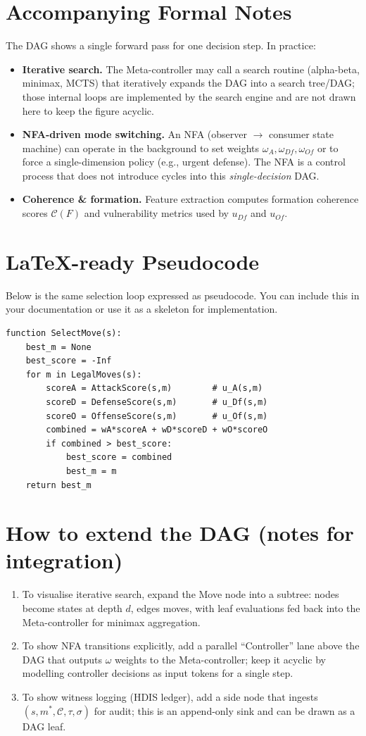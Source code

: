 \documentclass[12pt,a4paper]{article}
\begin{document}
\section{Accompanying Formal Notes}
The DAG shows a single forward pass for one decision step. In practice:
\begin{itemize}
  \item \textbf{Iterative search.} The Meta-controller may call a search routine (alpha-beta, minimax, MCTS) that iteratively expands the DAG into a search tree/DAG; those internal loops are implemented by the search engine and are not drawn here to keep the figure acyclic.
  \item \textbf{NFA-driven mode switching.} An NFA (observer \(\to\) consumer state machine) can operate in the background to set weights $\omega_A,\omega_{Df},\omega_{Of}$ or to force a single-dimension policy (e.g., urgent defense). The NFA is a control process that does not introduce cycles into this \emph{single-decision} DAG.
  \item \textbf{Coherence \& formation.} Feature extraction computes formation coherence scores $\mathcal C(F)$ and vulnerability metrics used by $u_{Df}$ and $u_{Of}$.
\end{itemize}

\section{LaTeX-ready Pseudocode}
Below is the same selection loop expressed as pseudocode. You can include this in your documentation or use it as a skeleton for implementation.

\begin{lstlisting}[caption={Decision selection pseudocode}]
function SelectMove(s):
    best_m = None
    best_score = -Inf
    for m in LegalMoves(s):
        scoreA = AttackScore(s,m)        # u_A(s,m)
        scoreD = DefenseScore(s,m)       # u_Df(s,m)
        scoreO = OffenseScore(s,m)       # u_Of(s,m)
        combined = wA*scoreA + wD*scoreD + wO*scoreO
        if combined > best_score:
            best_score = combined
            best_m = m
    return best_m
\end{lstlisting}

\section{How to extend the DAG (notes for integration)}
\begin{enumerate}
  \item To visualise iterative search, expand the Move node into a subtree: nodes become states at depth $d$, edges moves, with leaf evaluations fed back into the Meta-controller for minimax aggregation.
  \item To show NFA transitions explicitly, add a parallel ``Controller'' lane above the DAG that outputs $\omega$ weights to the Meta-controller; keep it acyclic by modelling controller decisions as input tokens for a single step.
  \item To show witness logging (HDIS ledger), add a side node that ingests $(s,m^*,\mathcal C,\tau,\sigma)$ for audit; this is an append-only sink and can be drawn as a DAG leaf.
\end{enumerate}
\end{document}
